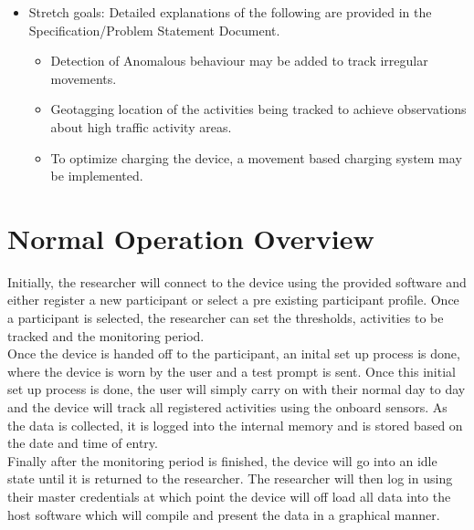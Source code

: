 \documentclass[12pt]{article}
\begin{document}
\begin{itemize}
\item Stretch goals: Detailed explanations of the following are provided in the Specification/Problem Statement Document.
	\begin{itemize}
		\item Detection of Anomalous behaviour may be added to track irregular movements.
		\item Geotagging location of the activities being tracked to achieve observations about high traffic activity areas.
		\item To optimize charging the device, a movement based charging system may be implemented.
	\end{itemize}
\end{itemize}

\section{Normal Operation Overview}
\setlength{\parindent}{20pt}
Initially, the researcher will connect to the device using the provided software and either register a new participant or select a pre existing participant profile. Once a participant is selected, the researcher can set the thresholds, activities to be tracked and the monitoring period. \\

Once the device is handed off to the participant, an inital set up process is done, where the device is worn by the user and a test prompt is sent. Once this initial set up process is done, the user will simply carry on with their normal day to day and the device will track all registered activities using the onboard sensors. As the data is collected, it is logged into the internal memory and is stored based on the date and time of entry.\\

Finally after the monitoring period is finished, the device will go into an idle state until it is returned to the researcher. The researcher will then log in using their master credentials at which point the device will off load all data into the host software which will compile and present the data in a graphical manner.

\end{document}
